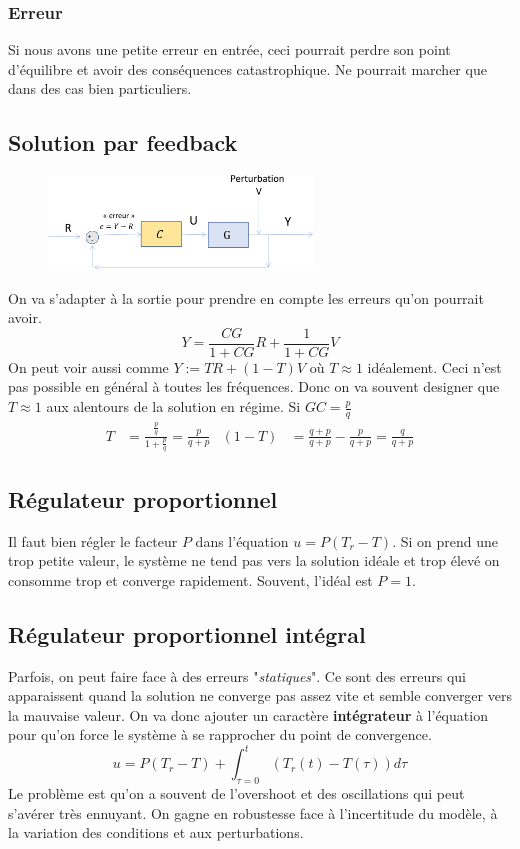 \documentclass{report}
\begin{document}
\subsubsection{Erreur}
Si nous avons une petite erreur en entrée, ceci pourrait perdre son point d'équilibre et avoir des conséquences catastrophique. Ne pourrait marcher que dans des cas bien particuliers. 

\subsection{Solution par feedback}
\begin{figure}[H]
\centering
\includegraphics[width=7cm]{img/feedbeck.png}
\end{figure}
On va s'adapter à la sortie pour prendre en compte les erreurs qu'on pourrait avoir.
\begin{equation}
Y = \frac{CG}{1 + CG} R + \frac{1}{1 + CG}V
\end{equation}
On peut voir aussi comme $Y := TR + (1-T) V$ où $T \approx 1$ idéalement. Ceci n'est pas possible en général à toutes les fréquences. Donc on va souvent designer que $T \approx 1$ aux alentours de la solution en régime. Si $GC = \frac{p}{q}$
\begin{align*}
T &= \frac{\frac{p}{q}}{1+ \frac{p}{q}} = \frac{p}{q + p} & (1-T) &= \frac{q + p}{q + p} - \frac{p}{q + p} = \frac{q}{q + p}
\end{align*}

\subsection{Régulateur proportionnel}
Il faut bien régler le facteur $P$ dans l'équation $u = P(T_r -T)$. Si on prend une trop petite valeur, le système ne tend pas vers la solution idéale et trop élevé on consomme trop et converge rapidement. Souvent, l'idéal est $P = 1$.

\subsection{Régulateur proportionnel intégral}
Parfois, on peut faire face à des erreurs "\textit{statiques}". Ce sont des erreurs qui apparaissent quand la solution ne converge pas assez vite et semble converger vers la mauvaise valeur. On va donc ajouter un caractère \textbf{intégrateur} à l'équation pour qu'on force le système à se rapprocher du point de convergence.
\begin{equation}
u = P(T_r - T) + \int_{\tau  = 0}^{t} (T_r (t) - T(\tau)) d\tau
\end{equation}
Le problème est qu'on a souvent de l'overshoot et des oscillations qui peut s'avérer très ennuyant. On gagne en robustesse face à l'incertitude du modèle, à la variation des conditions et aux perturbations.
\end{document}
